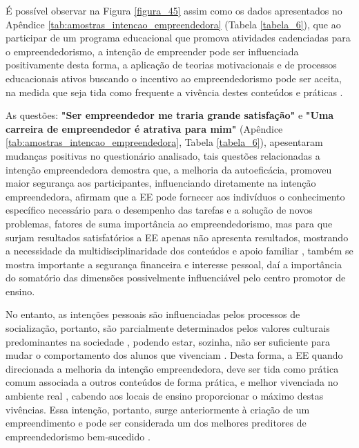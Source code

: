 É possível observar na Figura \ref{figura_45} assim como os dados apresentados no Apêndice \ref{tab:amostras_intencao_empreendedora} (Tabela \ref{tabela_6}), que ao participar de um programa educacional que promova atividades cadenciadas para o empreendedorismo, a intenção de empreender pode ser influenciada positivamente desta forma, a aplicação de teorias motivacionais e de processos educacionais ativos buscando o incentivo ao empreendedorismo pode ser aceita, na medida que seja tida como frequente a vivência destes conteúdos e práticas \cite{fayolle_beyond_2014}.

As questões: \textbf{"Ser empreendedor me traria grande satisfação"} e \textbf{"Uma carreira de empreendedor é atrativa para mim"} (Apêndice \ref{tab:amostras_intencao_empreendedora}, Tabela \ref{tabela_6}), apesentaram mudanças positivas no questionário analisado, tais questões relacionadas a intenção empreendedora demostra que, a melhoria da autoeficácia, promoveu maior segurança aos participantes, influenciando diretamente na intenção empreendedora,  afirmam que a EE pode fornecer aos indivíduos o conhecimento específico necessário para o desempenho das tarefas e a solução de novos problemas, fatores de suma importância ao empreendedorismo, mas para que surjam resultados satisfatórios a EE apenas não apresenta resultados, mostrando a necessidade da multidisciplinaridade dos conteúdos e apoio familiar \cite{edelman_impact_2016}, também se mostra importante a segurança financeira e interesse pessoal, daí a importância do somatório das dimensões possivelmente influenciável pelo centro promotor de ensino.

No entanto, as intenções pessoais são influenciadas pelos processos de socialização, portanto, são parcialmente determinados pelos valores culturais predominantes na sociedade \cite{schwartz_les_2006}, podendo estar, sozinha, não ser suficiente para mudar o comportamento dos alunos que vivenciam \cite{adelaja_students_2018}. Desta forma, a EE quando direcionada a melhoria da intenção empreendedora, deve ser tida como prática comum associada a outros conteúdos de forma prática, e melhor vivenciada no ambiente real \cite{damanpour_phases_2006}, cabendo aos locais de ensino proporcionar o máximo destas vivências. Essa intenção, portanto, surge anteriormente à criação de um empreendimento e pode ser considerada um dos melhores preditores de empreendedorismo bem-sucedido \cite{ajzen_attitudes_1987,krueger_competing_2000,garcia-rodriguez_entrepreneurial_2017}.

